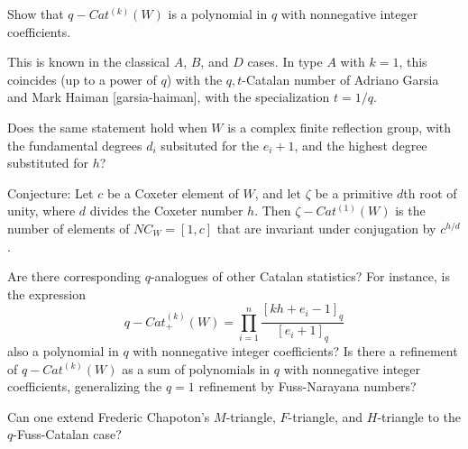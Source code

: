 \documentclass[12pt,letterpaper, reqno]{amsart}
\begin{document}
\begin{problemblock}
\begin{problem}[2.1] Show that $q-Cat^{(k)}(W)$ is a polynomial in $q$ with nonnegative integer coefficients.
\end{problem}

\begin{distinguishedremark}
This is known in the classical $A$, $B$, and $D$ cases. In type $A$ with $k=1$, this coincides (up to a power of $q$) with the $q,t$-Catalan number of Adriano Garsia and Mark Haiman [garsia-haiman], with the specialization $t=1/q$.
\end{distinguishedremark}

\begin{remark}
 Does the same statement hold when $W$ is a complex finite reflection group, with the fundamental degrees $d_i$ subsituted for the $e_i+1$, and the highest degree substituted for $h$?
\end{remark}

\begin{remark}
 Conjecture: Let $c$ be a Coxeter element of $W$, and let $\zeta$ be a primitive $d$th root of unity, where $d$ divides the Coxeter number $h$. Then $\zeta-Cat^{(1)}(W)$ is the number of elements of $NC_W=[1,c]$ that are invariant under conjugation by $c^{h/d}$.
\end{remark}

\begin{remark}
 Are there corresponding $q$-analogues of other Catalan statistics? For instance, is the expression
$$
q-Cat^{(k)}_+(W)=\prod_{i=1}^n \frac{[kh+e_i-1]_q}{[e_i+1]_q}
$$
also a polynomial in $q$ with nonnegative integer coefficients? Is there a refinement of
$q-Cat^{(k)}(W)$ as a sum of polynomials in $q$ with nonnegative integer coefficients, generalizing the $q=1$ refinement by Fuss-Narayana numbers?
\end{remark}

\begin{remark}
Can one extend Frederic Chapoton's $M$-triangle, $F$-triangle, and $H$-triangle to the $q$-Fuss-Catalan case?
\end{remark}

\end{problemblock}
\end{document}
